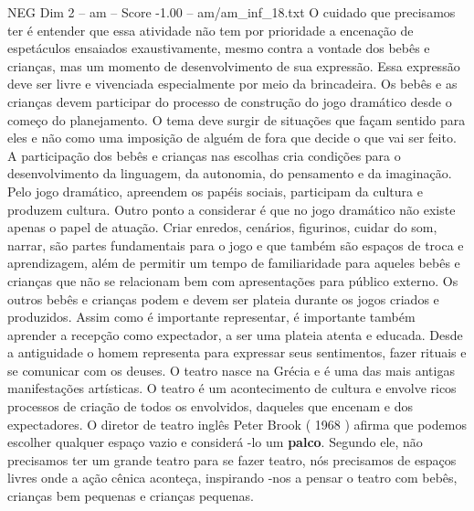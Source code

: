 \begin{textsample}{NEG Dim 2 – am – Score -1.00 – am/am\_inf\_18.txt}
O cuidado que precisamos ter é entender que essa atividade não tem por prioridade a encenação de espetáculos ensaiados exaustivamente, mesmo contra a vontade dos bebês e crianças, mas um momento de desenvolvimento de sua expressão.
Essa expressão deve ser livre e vivenciada especialmente por meio da brincadeira.
Os bebês e as crianças devem participar do processo de construção do jogo dramático desde o começo do planejamento.
O tema deve surgir de situações que façam sentido para eles e não como uma imposição de alguém de fora que decide o que vai ser feito.
A participação dos bebês e crianças nas escolhas cria condições para o desenvolvimento da linguagem, da autonomia, do pensamento e da imaginação.
Pelo jogo dramático, apreendem os papéis sociais, participam da cultura e produzem cultura.
Outro ponto a considerar é que no jogo dramático não existe apenas o papel de atuação.
Criar enredos, cenários, figurinos, cuidar do som, narrar, são partes fundamentais para o jogo e que também são espaços de troca e aprendizagem, além de permitir um tempo de familiaridade para aqueles bebês e crianças que não se relacionam bem com apresentações para público externo.
Os outros bebês e crianças podem e devem ser plateia durante os jogos criados e produzidos.
Assim como é importante representar, é importante também aprender a recepção como expectador, a ser uma plateia atenta e educada.
Desde a antiguidade o homem representa para expressar seus sentimentos, fazer rituais e se comunicar com os deuses.
O teatro nasce na Grécia e é uma das mais antigas manifestações artísticas.
O teatro é um acontecimento de cultura e envolve ricos processos de criação de todos os envolvidos, daqueles que encenam e dos expectadores.
O diretor de teatro inglês Peter Brook ( 1968 ) afirma que podemos escolher qualquer espaço vazio e considerá -lo um \textbf{palco}.
Segundo ele, não precisamos ter um grande teatro para se fazer teatro, nós precisamos de espaços livres onde a ação cênica aconteça, inspirando -nos a pensar o teatro com bebês, crianças bem pequenas e crianças pequenas.

\end{textsample}
